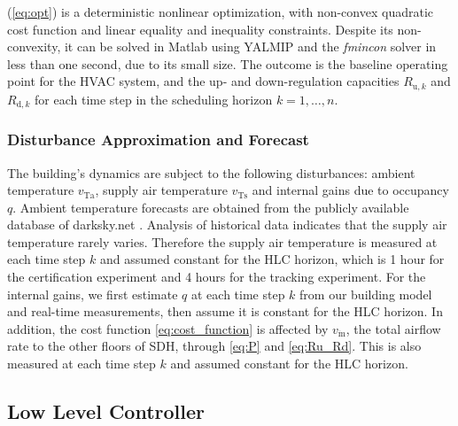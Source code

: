 \noindent (\ref{eq:opt}) is a deterministic nonlinear optimization, with non-convex quadratic cost function and linear equality and inequality constraints. Despite its non-convexity, it can be solved in Matlab using YALMIP \cite{Lofberg:2004yalmip} and the \textit{fmincon} solver in less than one second, due to its small size. The outcome is the baseline operating point for the HVAC system, and the up- and down-regulation capacities $R_{\text{u},k}$ and $R_{\text{d},k}$ for each time step in the scheduling horizon $k = 1, \ldots, n$.


\subsubsection{Disturbance Approximation and Forecast}
The building's dynamics are subject to the following disturbances: ambient temperature $v_{\text{Ta}}$, supply air temperature $v_{\text{Ts}}$ and internal gains due to occupancy $q$. 
Ambient temperature forecasts are obtained from the publicly available database of darksky.net \cite{darksky}. 
Analysis of historical data indicates that the supply air temperature rarely varies.
Therefore the supply air temperature is measured at each time step $k$ and assumed constant for the HLC horizon, which is 1 hour for the certification experiment and 4 hours for the tracking experiment.
For the internal gains, we first estimate $q$ at each time step $k$ from our building model and real-time measurements, then assume it is constant for the HLC horizon.
In addition, the cost function \eqref{eq:cost_function} is affected by $v_{\dot{\text{m}}}$, the total airflow rate to the other floors of SDH, through \eqref{eq:P} and \eqref{eq:Ru_Rd}. This is also measured at each time step $k$ and assumed constant for the HLC horizon.






\subsection{Low Level Controller}\label{sec:llc}


